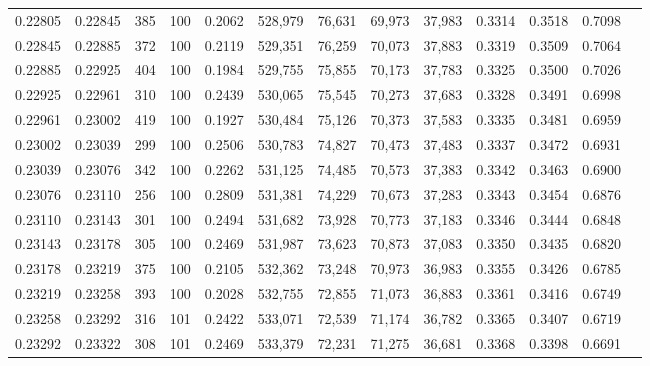 \begin{tabular}{rrrrrrrrrrrrr}
0.22805 & 0.22845 &   385 & 100 &                                     0.2062 & 528,979 &  76,631 &  69,973 &  37,983 & 0.3314 & 0.3518 & 0.7098 \\
0.22845 & 0.22885 &   372 & 100 &                                     0.2119 & 529,351 &  76,259 &  70,073 &  37,883 & 0.3319 & 0.3509 & 0.7064 \\
0.22885 & 0.22925 &   404 & 100 &                                     0.1984 & 529,755 &  75,855 &  70,173 &  37,783 & 0.3325 & 0.3500 & 0.7026 \\
0.22925 & 0.22961 &   310 & 100 &                                     0.2439 & 530,065 &  75,545 &  70,273 &  37,683 & 0.3328 & 0.3491 & 0.6998 \\
0.22961 & 0.23002 &   419 & 100 &                                     0.1927 & 530,484 &  75,126 &  70,373 &  37,583 & 0.3335 & 0.3481 & 0.6959 \\
0.23002 & 0.23039 &   299 & 100 &                                     0.2506 & 530,783 &  74,827 &  70,473 &  37,483 & 0.3337 & 0.3472 & 0.6931 \\
0.23039 & 0.23076 &   342 & 100 &                                     0.2262 & 531,125 &  74,485 &  70,573 &  37,383 & 0.3342 & 0.3463 & 0.6900 \\
0.23076 & 0.23110 &   256 & 100 &                                     0.2809 & 531,381 &  74,229 &  70,673 &  37,283 & 0.3343 & 0.3454 & 0.6876 \\
0.23110 & 0.23143 &   301 & 100 &                                     0.2494 & 531,682 &  73,928 &  70,773 &  37,183 & 0.3346 & 0.3444 & 0.6848 \\
0.23143 & 0.23178 &   305 & 100 &                                     0.2469 & 531,987 &  73,623 &  70,873 &  37,083 & 0.3350 & 0.3435 & 0.6820 \\
0.23178 & 0.23219 &   375 & 100 &                                     0.2105 & 532,362 &  73,248 &  70,973 &  36,983 & 0.3355 & 0.3426 & 0.6785 \\
0.23219 & 0.23258 &   393 & 100 &                                     0.2028 & 532,755 &  72,855 &  71,073 &  36,883 & 0.3361 & 0.3416 & 0.6749 \\
0.23258 & 0.23292 &   316 & 101 &                                     0.2422 & 533,071 &  72,539 &  71,174 &  36,782 & 0.3365 & 0.3407 & 0.6719 \\
0.23292 & 0.23322 &   308 & 101 &                                     0.2469 & 533,379 &  72,231 &  71,275 &  36,681 & 0.3368 & 0.3398 & 0.6691 \\

\end{tabular}
